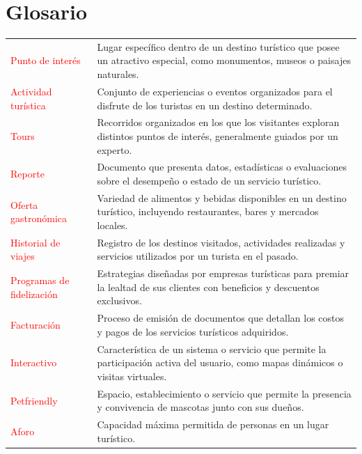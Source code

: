 \chapter{Glosario}


\begin{center}
\begin{tabular}{p{4cm} p{11cm}}
    \textcolor{red}{Punto de interés} & Lugar específico dentro de un destino turístico que posee un atractivo especial, como monumentos, museos o paisajes naturales. \\
    \textcolor{red}{Actividad turística} & Conjunto de experiencias o eventos organizados para el disfrute de los turistas en un destino determinado. \\
    \textcolor{red}{Tours} & Recorridos organizados en los que los visitantes exploran distintos puntos de interés, generalmente guiados por un experto. \\
    \textcolor{red}{Reporte} & Documento que presenta datos, estadísticas o evaluaciones sobre el desempeño o estado de un servicio turístico. \\
    \textcolor{red}{Oferta gastronómica} & Variedad de alimentos y bebidas disponibles en un destino turístico, incluyendo restaurantes, bares y mercados locales. \\
    \textcolor{red}{Historial de viajes} & Registro de los destinos visitados, actividades realizadas y servicios utilizados por un turista en el pasado. \\
    \textcolor{red}{Programas de fidelización} & Estrategias diseñadas por empresas turísticas para premiar la lealtad de sus clientes con beneficios y descuentos exclusivos. \\
    \textcolor{red}{Facturación} & Proceso de emisión de documentos que detallan los costos y pagos de los servicios turísticos adquiridos. \\
    \textcolor{red}{Interactivo} & Característica de un sistema o servicio que permite la participación activa del usuario, como mapas dinámicos o visitas virtuales. \\
    \textcolor{red}{Petfriendly} & Espacio, establecimiento o servicio que permite la presencia y convivencia de mascotas junto con sus dueños. \\
    \textcolor{red}{Aforo} & Capacidad máxima permitida de personas en un lugar turístico. \\
\end{tabular}
\end{center}
